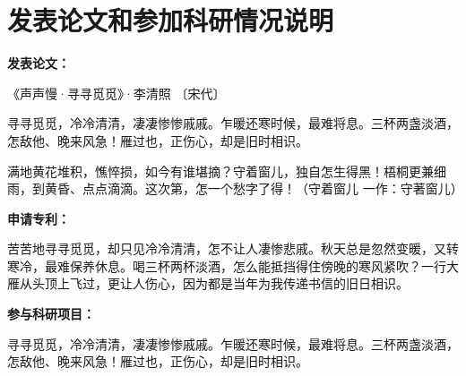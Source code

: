 \chapter*{发表论文和参加科研情况说明}
\thispagestyle{fancy}

\noindent
\textbf{发表论文：}

《声声慢·寻寻觅觅》·李清照 〔宋代〕

寻寻觅觅，冷冷清清，凄凄惨惨戚戚。乍暖还寒时候，最难将息。三杯两盏淡酒，怎敌他、晚来风急！雁过也，正伤心，却是旧时相识。

满地黄花堆积，憔悴损，如今有谁堪摘？守着窗儿，独自怎生得黑！梧桐更兼细雨，到黄昏、点点滴滴。这次第，怎一个愁字了得！（守着窗儿 一作：守著窗儿）

\noindent
\textbf{申请专利：}

苦苦地寻寻觅觅，却只见冷冷清清，怎不让人凄惨悲戚。秋天总是忽然变暖，又转寒冷，最难保养休息。喝三杯两杯淡酒，怎么能抵挡得住傍晚的寒风紧吹？一行大雁从头顶上飞过，更让人伤心，因为都是当年为我传递书信的旧日相识。

\noindent
\textbf{参与科研项目：}

寻寻觅觅，冷冷清清，凄凄惨惨戚戚。乍暖还寒时候，最难将息。三杯两盏淡酒，怎敌他、晚来风急！雁过也，正伤心，却是旧时相识。